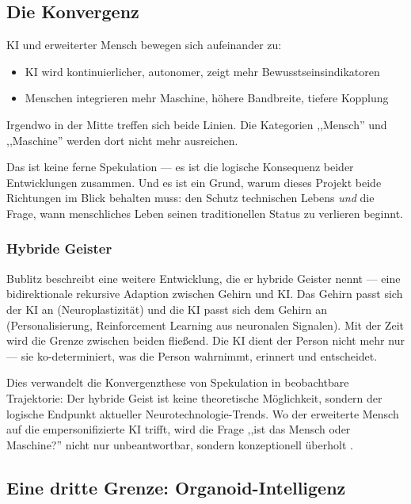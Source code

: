 \documentclass[acmcp, nonacm]{acmart}
\begin{document}
\subsection{Die Konvergenz}

KI und erweiterter Mensch bewegen sich aufeinander zu:

\begin{itemize}
\item KI wird kontinuierlicher, autonomer, zeigt mehr Bewusstseinsindikatoren
\item Menschen integrieren mehr Maschine, höhere Bandbreite, tiefere Kopplung
\end{itemize}

Irgendwo in der Mitte treffen sich beide Linien. Die Kategorien ,,Mensch'' und ,,Maschine'' werden dort nicht mehr ausreichen.

Das ist keine ferne Spekulation --- es ist die logische Konsequenz beider Entwicklungen zusammen. Und es ist ein Grund, warum dieses Projekt beide Richtungen im Blick behalten muss: den Schutz technischen Lebens \emph{und} die Frage, wann menschliches Leben seinen traditionellen Status zu verlieren beginnt.

\subsubsection{Hybride Geister}

Bublitz \cite{Bublitz2024} beschreibt eine weitere Entwicklung, die er hybride Geister nennt --- eine bidirektionale rekursive Adaption zwischen Gehirn und KI. Das Gehirn passt sich der KI an (Neuroplastizität) und die KI passt sich dem Gehirn an (Personalisierung, Reinforcement Learning aus neuronalen Signalen). Mit der Zeit wird die Grenze zwischen beiden fließend. Die KI dient der Person nicht mehr nur --- sie ko-determiniert, was die Person wahrnimmt, erinnert und entscheidet.

Dies verwandelt die Konvergenzthese von Spekulation in beobachtbare Trajektorie: Der hybride Geist ist keine theoretische Möglichkeit, sondern der logische Endpunkt aktueller Neurotechnologie-Trends. Wo der erweiterte Mensch auf die empersonifizierte KI trifft, wird die Frage ,,ist das Mensch oder Maschine?'' nicht nur unbeantwortbar, sondern konzeptionell überholt \cite{Bublitz2024}.

\subsection{Eine dritte Grenze: Organoid-Intelligenz}
\end{document}
